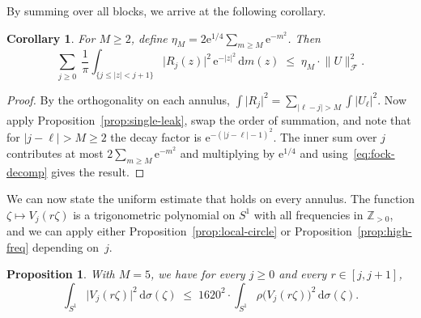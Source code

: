 \documentclass[11pt]{amsart}
\newtheorem{proposition}[theorem]{Proposition}
\newtheorem{corollary}[theorem]{Corollary}
\theoremstyle{remark}
\begin{document}
By summing over all blocks, we arrive at the following corollary.
\begin{corollary}\label{cor:total-leak} For $M \ge 2$, define $\eta_M = 2\mathrm{e}^{1/4}\sum_{m \ge M}\mathrm{e}^{-m^2}$.  Then
\[
\sum_{j \ge 0}\;
\frac{1}{\pi}\int_{\{j \le \lvert z \rvert < j+1\}}
\lvert R_j(z) \rvert^2\, \mathrm{e}^{-\lvert z \rvert^2}\,\mathrm{d} m(z)
\;\le\;
\eta_M \cdot \lVert U \rVert_{\mathcal{F}}^2.
\]
\end{corollary}

\begin{proof}
By the orthogonality on each annulus,
$\int \lvert R_j \rvert^2 = \sum_{\lvert \ell-j \rvert>M}\int\lvert U_\ell \rvert^2$.
Now apply Proposition~\ref{prop:single-leak}, swap the order of summation, and note that for $\lvert j-\ell \rvert > M \ge 2$
the decay factor is $\mathrm{e}^{-(\lvert j-\ell \rvert-1)^2}$.  The inner sum over
$j$ contributes at most $2\sum_{m \ge M}\mathrm{e}^{-m^2}$ and multiplying by
$\mathrm{e}^{1/4}$ and using~\eqref{eq:fock-decomp} gives the result.
\end{proof}


We can now state the uniform estimate that holds on every annulus.  The
function $\zeta \mapsto V_j(r\zeta)$ is a trigonometric polynomial on $S^1$
with all frequencies in $\mathbb{Z}_{>0}$, and we can apply either
Proposition~\ref{prop:local-circle} or Proposition~\ref{prop:high-freq} depending
on~$j$.

\begin{proposition}\label{prop:annulus} With $M = 5$, we have for every $j \ge 0$ and every $r \in [j, j{+}1]$,
\[
\int_{S^1}\lvert V_j(r\zeta) \rvert^2\,\mathrm{d}\sigma(\zeta)
\;\le\;
1620^2 \cdot
\int_{S^1}\rho\bigl(V_j(r\zeta)\bigr)^2\,\mathrm{d}\sigma(\zeta).
\]
\end{proposition}
\end{document}
